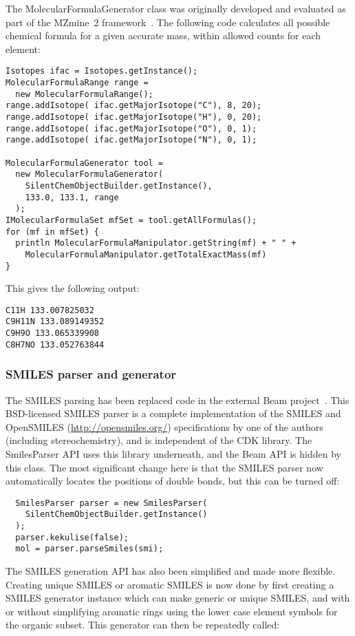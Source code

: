 \documentclass[10pt]{bmcart}
\begin{document}
The MolecularFormulaGenerator class was originally developed and evaluated 
as part of the MZmine~2 framework~\cite{Pluskal2012}. The following code
calculates all possible chemical formula for a given accurate mass, 
within allowed counts for each element:

\begin{verbatim}
Isotopes ifac = Isotopes.getInstance();
MolecularFormulaRange range =
  new MolecularFormulaRange();
range.addIsotope( ifac.getMajorIsotope("C"), 8, 20);
range.addIsotope( ifac.getMajorIsotope("H"), 0, 20);
range.addIsotope( ifac.getMajorIsotope("O"), 0, 1);
range.addIsotope( ifac.getMajorIsotope("N"), 0, 1);

MolecularFormulaGenerator tool =
  new MolecularFormulaGenerator(
    SilentChemObjectBuilder.getInstance(),
    133.0, 133.1, range
  );
IMolecularFormulaSet mfSet = tool.getAllFormulas();
for (mf in mfSet) {
  println MolecularFormulaManipulator.getString(mf) + " " +
    MolecularFormulaManipulator.getTotalExactMass(mf)
}
\end{verbatim}

This gives the following output:

\begin{verbatim}
C11H 133.007825032
C9H11N 133.089149352
C9H9O 133.065339908
C8H7NO 133.052763844
\end{verbatim}


  \subsubsection*{SMILES parser and generator}

  The SMILES parsing has been replaced code in the external Beam project~\cite{Beam}.
  This BSD-licensed SMILES parser is a complete implementation of the SMILES
  and OpenSMILES (\url{http://opensmiles.org/}) specifications by one of the
  authors (including stereochemistry), and is independent of
  the CDK library. The SmilesParser API uses this library underneath, and the
  Beam API is hidden by this class. The most significant change here is that
  the SMILES parser now automatically locates the positions of double bonds,
  but this can be turned off:

\begin{verbatim}
  SmilesParser parser = new SmilesParser(
    SilentChemObjectBuilder.getInstance()
  );
  parser.kekulise(false);
  mol = parser.parseSmiles(smi);
\end{verbatim}

  The SMILES generation API has also been simplified and made more flexible.
  Creating unique SMILES or aromatic SMILES is now done by first creating a
  SMILES generator instance which can make generic or unique SMILES, and with
  or without simplifying aromatic rings using the lower case element symbols
  for the organic subset. This generator can then be repeatedly called:
\end{document}
